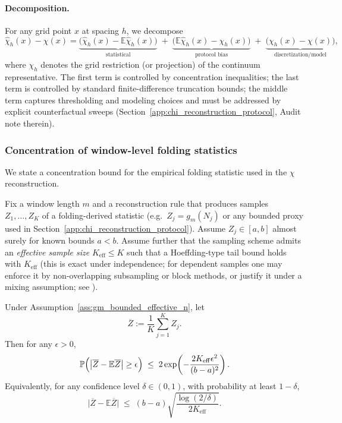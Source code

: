\paragraph{Decomposition.}
\InterfaceTag For any grid point $x$ at spacing $h$, we decompose
\[
\widehat\chi_h(x)-\chi(x)
=\underbrace{\bigl(\widehat\chi_h(x)-\mathbb{E}\widehat\chi_h(x)\bigr)}_{\text{statistical}}
\;+\;\underbrace{\bigl(\mathbb{E}\widehat\chi_h(x)-\chi_h(x)\bigr)}_{\text{protocol bias}}
\;+\;\underbrace{\bigl(\chi_h(x)-\chi(x)\bigr)}_{\text{discretization/model}},
\]
where $\chi_h$ denotes the grid restriction (or projection) of the continuum representative.
The first term is controlled by concentration inequalities; the last term is controlled by standard finite-difference truncation bounds; the middle term captures thresholding and modeling choices and must be addressed by explicit counterfactual sweeps (Section~\ref{app:chi_reconstruction_protocol}, Audit note therein).

\subsubsection{Concentration of window-level folding statistics}
\label{subsec:prot_to_cont_concentration}

We state a concentration bound for the empirical folding statistic used in the $\chi$ reconstruction.

\begin{assumption}\label{ass:gm_bounded_effective_n}
Fix a window length $m$ and a reconstruction rule that produces samples $Z_1,\dots,Z_K$ of a folding-derived statistic (e.g.\ $Z_j=g_m(N_j)$ or any bounded proxy used in Section~\ref{app:chi_reconstruction_protocol}).
Assume $Z_j\in[a,b]$ almost surely for known bounds $a<b$.
Assume further that the sampling scheme admits an \emph{effective sample size} $K_{\mathrm{eff}}\le K$ such that a Hoeffding-type tail bound holds with $K_{\mathrm{eff}}$ (this is exact under independence; for dependent samples one may enforce it by non-overlapping subsampling or block methods, or justify it under a mixing assumption; see \cite{Hoeffding1963,BoucheronLugosiMassart2013}).
\end{assumption}

\begin{theorem}\label{thm:gm_concentration}
Under Assumption~\ref{ass:gm_bounded_effective_n}, let
\[
\overline Z:=\frac{1}{K}\sum_{j=1}^{K} Z_j.
\]
Then for any $\epsilon>0$,
\[
\mathbb{P}\Bigl(\bigl|\overline Z-\mathbb{E}\overline Z\bigr|\ge \epsilon\Bigr)
\;\le\;2\exp\!\left(-\frac{2K_{\mathrm{eff}}\epsilon^2}{(b-a)^2}\right).
\]
Equivalently, for any confidence level $\delta\in(0,1)$, with probability at least $1-\delta$,
\[
\bigl|\overline Z-\mathbb{E}\overline Z\bigr|
\;\le\;
(b-a)\sqrt{\frac{\log(2/\delta)}{2K_{\mathrm{eff}}}}.
\]
\end{theorem}

